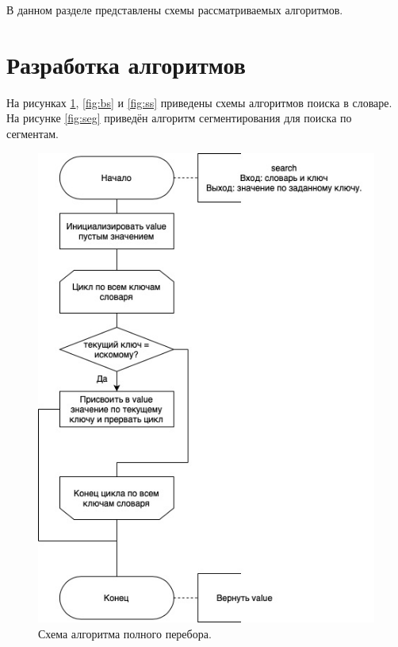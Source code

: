\documentclass[12pt]{report}
\begin{document}
В данном разделе представлены схемы рассматриваемых алгоритмов.
	
\section{Разработка алгоритмов}
	
На рисунках \ref{fig:s}, \ref{fig:bs} и \ref{fig:ss} приведены схемы алгоритмов поиска в словаре. На рисунке  \ref{fig:seg} приведён алгоритм сегментирования для поиска по сегментам.
	
	\begin{figure}[H]
		\centering
		\includegraphics[scale=0.57]{scheme-search.jpg}
		\caption{Схема алгоритма полного перебора.}
		\label{fig:s}
	\end{figure}
	
\end{document}
